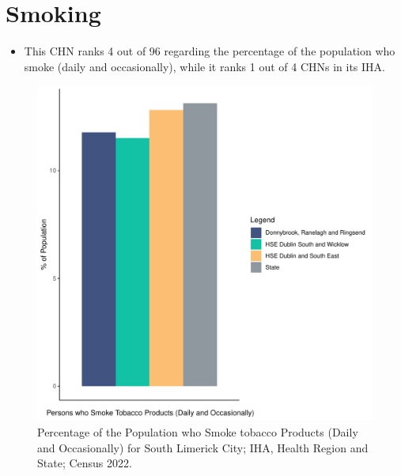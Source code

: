 \documentclass{article}
\begin{document}
\pagebreak

\section{Smoking}\label{sect:Smoking}
\begin{itemize}
\item This CHN ranks  4 out of 96 regarding the percentage of the population who smoke (daily and occasionally), while it ranks   1 out of 4 CHNs in its IHA.
\end{itemize}
\begin{figure}[H]
	\centering
	\includegraphics[width = 120mm]{../figures/SmokingED.pdf}
	\caption{Percentage of the Population who Smoke tobacco Products (Daily and Occasionally) for South Limerick City; IHA, Health Region and State; Census 2022.}
	\label{fig:2ae19629-1a6a-13a3-e055-000000000001}
	\end{figure}
	
\end{document}
